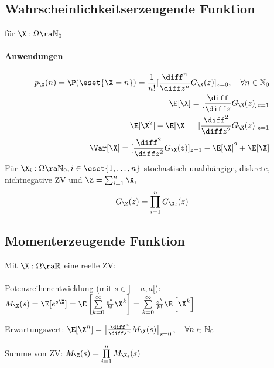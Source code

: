 \documentclass[german,color,6pt]{latex4ei/latex4ei_sheet}
\begin{document}
\begin{sectionbox}
	\subsection{Wahrscheinlichkeitserzeugende Funktion}
	für $\X : \Omega \ra \mathbb N_0$


	\paragraph{Anwendungen}
	\begin{eqnarray*}
		p_{\X}(n) =\P(\eset{\X = n}) = \frac{1}{n!} [\frac{\diff^n}{\diff z^n} G_{\X} (z)]_{z = 0}, \quad \forall n \in \mathbb N_0 \\
		\E [\X] = [\frac{\diff}{\diff z} G_{\X} (z)]_{z = 1} \\
		\E [\X^2]-\E[\X] = [\frac{\diff^2}{\diff z^2} G_{\X} (z)]_{z = 1} \\
		\Var [\X] =[\frac{\diff^2}{\diff z^2} G_{\X} (z)]_{z = 1} - \E [\X]^2 + \E [\X]
	\end{eqnarray*}
	Für $\X_i : \Omega \ra \mathbb N_0, i \in \eset{1, \ldots, n}$ stochastisch unabhängige, diskrete, nichtnegative ZV und $\Z = \sum_{i=1}^{n} \X_i$
	\[G_{\Z} (z) = \prod_{i = 1}^{n} G_{\X_i} (z)\]

\end{sectionbox}

\begin{sectionbox}
	\subsection{Momenterzeugende Funktion} %
	\label{sub:momenterzeugende_funktion}

	Mit $\X: \Omega \ra \mathbb R$ eine reelle ZV: \\

	\\


	Potenzreihenentwicklung (mit $s \in ]-a, a[$):\\
	$M_{\X} (s) = \E [ e^{s \X}] = \E \left[\sum \limits_{k=0}^{\infty} \frac{s^k}{k!} \X^k\right] = \sum \limits_{k=0}^{\infty} \frac{s^k}{k!} \E\left[\X^k\right]$

	Erwartungswert:
	$\E[\X^n] = \left[\frac{\diff^n}{\diff s^n} M_{\X} (s)\right]_{s=0}, \quad \forall n \in \mathbb N_0$

	Summe von ZV:
	$M_{\Z} (s) = \prod \limits_{i = 1}^{n} M_{\X_i} (s)$
\end{sectionbox}
\end{document}
